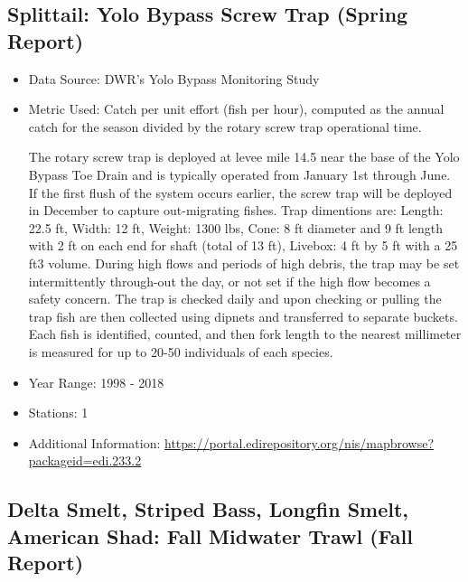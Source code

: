 \documentclass[
]{book}
\begin{document}
\hypertarget{splittail-yolo-bypass-screw-trap-spring-report}{%
\subsection{Splittail: Yolo Bypass Screw Trap (Spring Report)}\label{splittail-yolo-bypass-screw-trap-spring-report}}

\begin{itemize}
\item
  Data Source: DWR's Yolo Bypass Monitoring Study
\item
  Metric Used: Catch per unit effort (fish per hour), computed as the annual catch for the season divided by the rotary screw trap operational time.

  The rotary screw trap is deployed at levee mile 14.5 near the base of the Yolo Bypass Toe Drain and is typically operated from January 1st through June. If the first flush of the system occurs earlier, the screw trap will be deployed in December to capture out-migrating fishes. Trap dimentions are: Length: 22.5 ft, Width: 12 ft, Weight: 1300 lbs, Cone: 8 ft diameter and 9 ft length with 2 ft on each end for shaft (total of 13 ft), Livebox: 4 ft by 5 ft with a 25 ft3 volume. During high flows and periods of high debris, the trap may be set intermittently through-out the day, or not set if the high flow becomes a safety concern. The trap is checked daily and upon checking or pulling the trap fish are then collected using dipnets and transferred to separate buckets. Each fish is identified, counted, and then fork length to the nearest millimeter is measured for up to 20-50 individuals of each species.
\item
  Year Range: 1998 - 2018
\item
  Stations: 1
\item
  Additional Information: \url{https://portal.edirepository.org/nis/mapbrowse?packageid=edi.233.2}
\end{itemize}

\hypertarget{delta-smelt-striped-bass-longfin-smelt-american-shad-fall-midwater-trawl-fall-report}{%
\subsection{Delta Smelt, Striped Bass, Longfin Smelt, American Shad: Fall Midwater Trawl (Fall Report)}\label{delta-smelt-striped-bass-longfin-smelt-american-shad-fall-midwater-trawl-fall-report}}
\end{document}

